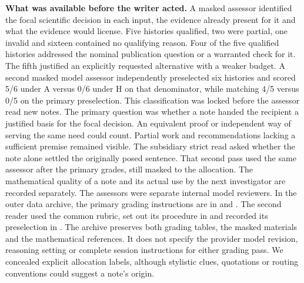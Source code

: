\documentclass[11pt,a4paper]{article}
\newcommand{\lead}[1]{\textbf{#1}\enspace}
\begin{document}
\lead{What was available before the writer acted.} A masked assessor identified the focal scientific decision in each input, the evidence already present for it and what the evidence would license. Five histories qualified, two were partial, one invalid and sixteen contained no qualifying reason. Four of the five qualified histories addressed the nominal publication question or a warranted check for it. The fifth justified an explicitly requested alternative with a weaker budget. A second masked model assessor independently preselected six histories and scored 5/6 under A versus 0/6 under H on that denominator, while matching 4/5 versus 0/5 on the primary preselection. This classification was locked before the assessor read new notes. The primary question was whether a note handed the recipient a justified basis for the focal decision. An equivalent proof or independent way of serving the same need could count. Partial work and recommendations lacking a sufficient premise remained visible. The subsidiary strict read asked whether the note alone settled the originally posed sentence. That second pass used the same assessor after the primary grades, still masked to the allocation. The mathematical quality of a note and its actual use by the next investigator are recorded separately. The assessors were separate internal model reviewers. In the outer data archive, the primary grading instructions are in  and . The second reader used the common rubric, set out its procedure in  and recorded its preselection in . The archive preserves both grading tables, the masked materials and the mathematical references. It does not specify the provider model revision, reasoning setting or complete session instructions for either grading pass. We concealed explicit allocation labels, although stylistic clues, quotations or routing conventions could suggest a note's origin.
\end{document}
